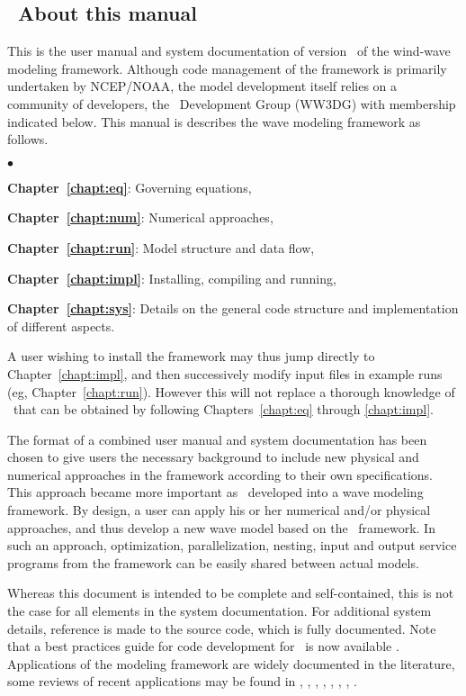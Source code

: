 \vssub
\subsection{~About this manual}
\vssub

This is the user manual and system documentation of version \WWver\ of the
\ww wind-wave modeling framework. Although code management of the framework is 
primarily undertaken by NCEP/NOAA, the model development itself relies on a community of developers, the 
\ws\ Development Group (WW3DG) with membership indicated below. This manual is describes the 
wave modeling framework as follows.

\begin{list}{$\bullet$}{\rightmargin 5mm \parsep 0mm \itemsep 0mm}
\item \textbf{Chapter~\ref{chapt:eq}}: Governing equations, 
\item \textbf{Chapter~\ref{chapt:num}}: Numerical approaches, 
\item \textbf{Chapter~\ref{chapt:run}}: Model structure and data flow, 
\item \textbf{Chapter~\ref{chapt:impl}}: Installing, compiling and running,
\item \textbf{Chapter~\ref{chapt:sys}}: Details on the general code structure and implementation of different aspects. 
\end{list}

A user wishing to install the framework may thus jump directly to Chapter~\ref{chapt:impl}, and then successively
modify input files in example runs (eg, Chapter~\ref{chapt:run}). However this will not replace a thorough knowledge of \ws\ 
that can be obtained by following Chapters~\ref{chapt:eq} through \ref{chapt:impl}.

The format of a combined user manual and
system documentation has been chosen to give users the necessary background
to include new physical and numerical approaches in the framework according to
their own specifications.  This approach became more important as \ws\
developed into a wave modeling framework. By design, a user can apply his or
her numerical and/or physical approaches, and thus develop a new wave model based
on the \ws\ framework. In such an approach, optimization, parallelization,
nesting, input and output service programs from the framework can be easily
shared between actual models.  

Whereas this document is intended to be
complete and self-contained, this is not the case for all elements in the
system documentation. For additional system details, reference is made to the
source code, which is fully documented. Note that a best practices guide for
code development for \ws\ is now available \citep{tol:MMAB10a, tol:MMAB14b}. 
Applications of the modeling framework are widely documented in the literature, 
some reviews of recent applications may be found in \cite{tol:WaF02}, \cite{art:HET09}, \cite{art:CET13a}, 
\cite{art:AET13}, \cite{art:RET14}, \cite{art:LiET14}, \cite{art:RAR14}, \cite{art:ZET18}.


